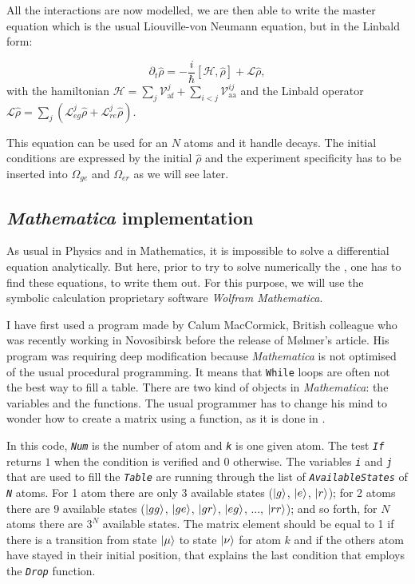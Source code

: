 \documentclass[%
]{scrreprt}
\newcommand{\ff}{\ensuremath{\ket{g}}\xspace}
\newcommand{\ee}{\ensuremath{\ket{e}}\xspace}
\newcommand{\rr}{\ensuremath{\ket{r}}\xspace}
\newcommand{\mat}{\emph{Mathematica}\xspace}
\newcommand{\matC}[1]{\textsl{\texttt{#1}}}
\newcommand{\Om}{\Omega}
\newcommand{\mc}[1]{\mathcal{#1}}
\newcommand{\hrho}{\hat{\rho}}
\begin{document}
\par All the interactions are now modelled, we are then able to write the master equation which is the usual Liouville-von Neumann equation, but in the Linbald form:

\begin{equation}
\partial_t \hrho = -\frac{i}{\hbar} [\mc{H}, \hrho] +  \mc{L} \hrho , 
\label{master-eq}
\end{equation}
with the hamiltonian  $\mc{H} = \sum_j \mc{V}_{\mathrm{af}}^j + \sum_{i<j} \mc{V}_{\mathrm{aa}}^{ij}$ and the Linbald operator $\mc{L} \hrho =  \sum_j (\mc{L}_{eg}^j \hrho + \mc{L}_{re}^j \hrho)$.

\par This equation can be used for an $N$ atoms and it handle decays. The initial conditions are expressed by the initial $\hrho$ and the experiment specificity has to be inserted into $\Om_{ge}$ and $\Om_{er}$ as we will see later. 

\subsection{\mat implementation}

\par As usual in Physics and in Mathematics, it is impossible to solve a differential equation analytically. But here, prior to try to solve numerically the , one has to find these equations, to write them out. For this purpose, we will use the symbolic calculation proprietary software \emph{Wolfram Mathematica}.

\par I have first used a program made by Calum MacCormick, British colleague who was recently working in Novosibirsk before the release of Mølmer's article. His program was requiring deep modification because \mat is not optimised of the usual procedural programming. It means that \texttt{While} loops are often not the best way to fill a table. There are two kind of objects in \mat: the variables and the functions. The usual programmer has to change his mind to wonder how to create a matrix using a function, as it is done in .
\par In this code, \matC{Num} is the number of atom and \matC{k} is one given atom. The test \matC{If} returns $1$ when the condition is verified and $0$ otherwise. The variables \matC{i} and \matC{j} that are used to fill the \matC{Table} are running through the list of \matC{AvailableStates} of \matC{N} atoms. For 1 atom there are only 3 available states (\ff, \ee, \rr); for 2 atoms there are 9 available states ($\ket{gg}$, $\ket{ge}$, $\ket{gr}$, $\ket{eg}$, ..., $\ket{rr}$); and so forth, for $N$ atoms there are $3^N$ available states. The matrix element should be equal to 1 if there is a transition from state $\ket{\mu}$ to state $\ket{\nu}$ for atom $k$ and if the others atom have stayed in their initial position, that explains the last condition that employs the \matC{Drop} function.
\end{document}
